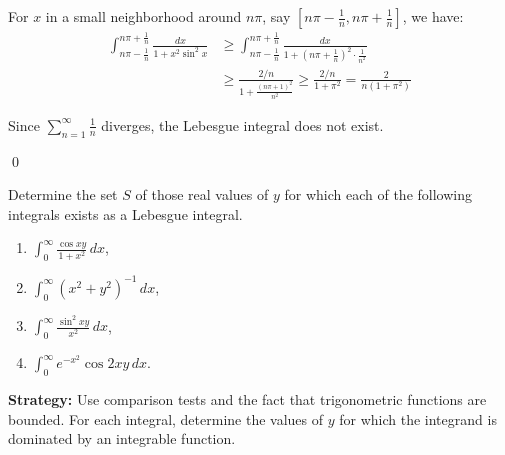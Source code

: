 \begin{enumerate}[label=(\alph*)]
For $x$ in a small neighborhood around $n\pi$, say $[n\pi - \frac{1}{n}, n\pi + \frac{1}{n}]$, we have:
\begin{align*}
\int_{n\pi - \frac{1}{n}}^{n\pi + \frac{1}{n}} \frac{dx}{1 + x^2 \sin^2 x} &\geq \int_{n\pi - \frac{1}{n}}^{n\pi + \frac{1}{n}} \frac{dx}{1 + (n\pi + \frac{1}{n})^2 \cdot \frac{1}{n^2}} \\
&\geq \frac{2/n}{1 + \frac{(n\pi + 1)^2}{n^2}} \geq \frac{2/n}{1 + \pi^2} = \frac{2}{n(1 + \pi^2)}
\end{align*}

Since $\sum_{n=1}^{\infty} \frac{1}{n}$ diverges, the Lebesgue integral does not exist.
\end{enumerate}\qed


\begin{problembox}
\begin{problemstatement}
Determine the set $S$ of those real values of $y$ for which each of the following integrals exists as a Lebesgue integral.
\begin{enumerate}[label=(\alph*)]
\item $\int_{0}^{\infty} \frac{\cos xy}{1 + x^2} \, dx$,
\item $\int_{0}^{\infty} (x^2 + y^2)^{-1} \, dx$,
\item $\int_{0}^{\infty} \frac{\sin^2 xy}{x^2} \, dx$,
\item $\int_{0}^{\infty} e^{-x^2} \cos 2xy \, dx.$
\end{enumerate}
\end{problemstatement}
\end{problembox}

\noindent\textbf{Strategy:} Use comparison tests and the fact that trigonometric functions are bounded. For each integral, determine the values of $y$ for which the integrand is dominated by an integrable function.

